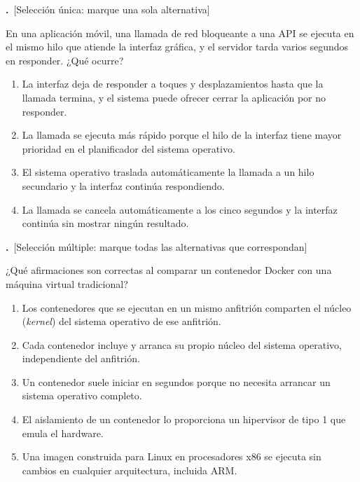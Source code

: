 \documentclass[11pt,a4paper]{article}
\newif\ifclave
\newcounter{preg}
\newcommand{\tipounica}{\textcolor{uteqMid}{\small\textsf{[Selección única: marque una sola alternativa]}}}
\newcommand{\tipomultiple}{\textcolor{uteqAmber!80!black}{\small\textsf{[Selección múltiple: marque todas las alternativas que correspondan]}}}
\newcommand{\pregunta}[2]{%
	\refstepcounter{preg}%
	\par\medskip
	\noindent\textbf{\color{uteqBlue}\arabic{preg}.}~#1\par
	\noindent #2\par\nopagebreak
}
\newcommand{\ok}{\ifclave~\textcolor{uteqGreen}{\ding{51}~\textbf{Correcta}}\fi}
\newenvironment{opciones}{%
	\begin{enumerate}[label={$\square$\ \alph*)},leftmargin=2.6em,itemsep=1pt,topsep=2pt]
}{%
	\end{enumerate}
}
\newcommand{\just}[1]{%
	\ifclave
		\begin{tcolorbox}[colback=uteqGreen!6,colframe=uteqGreen!70!black,boxrule=0.4pt,arc=1mm,left=4pt,right=4pt,top=2pt,bottom=2pt,fontupper=\small]
			\textbf{Justificación:} #1
		\end{tcolorbox}
	\fi
}
\begin{document}
\pregunta{\tipounica}{En una aplicación móvil, una llamada de red bloqueante a una API se ejecuta en el mismo hilo que atiende la interfaz gráfica, y el servidor tarda varios segundos en responder. ¿Qué ocurre?}
\begin{opciones}
	\item La interfaz deja de responder a toques y desplazamientos hasta que la llamada termina, y el sistema puede ofrecer cerrar la aplicación por no responder.\ok
	\item La llamada se ejecuta más rápido porque el hilo de la interfaz tiene mayor prioridad en el planificador del sistema operativo.
	\item El sistema operativo traslada automáticamente la llamada a un hilo secundario y la interfaz continúa respondiendo.
	\item La llamada se cancela automáticamente a los cinco segundos y la interfaz continúa sin mostrar ningún resultado.
\end{opciones}
\just{El hilo principal procesa los eventos de la interfaz; si se bloquea, la aplicación se congela (en Android se muestra el diálogo ANR, y la plataforma incluso prohíbe operaciones de red en ese hilo). Por eso las llamadas de red se ejecutan de forma asíncrona (corrutinas, \emph{futures}, \texttt{async/await}). El sistema no traslada la tarea de hilo ni la cancela por sí mismo.}

\pregunta{\tipomultiple}{¿Qué afirmaciones son correctas al comparar un contenedor Docker con una máquina virtual tradicional?}
\begin{opciones}
	\item Los contenedores que se ejecutan en un mismo anfitrión comparten el núcleo (\emph{kernel}) del sistema operativo de ese anfitrión.\ok
	\item Cada contenedor incluye y arranca su propio núcleo del sistema operativo, independiente del anfitrión.
	\item Un contenedor suele iniciar en segundos porque no necesita arrancar un sistema operativo completo.\ok
	\item El aislamiento de un contenedor lo proporciona un hipervisor de tipo 1 que emula el hardware.
	\item Una imagen construida para Linux en procesadores x86 se ejecuta sin cambios en cualquier arquitectura, incluida ARM.
\end{opciones}
\just{El contenedor es un proceso aislado mediante mecanismos del núcleo (espacios de nombres y grupos de control) y por eso arranca rápido. Las máquinas virtuales, no los contenedores, usan hipervisor y núcleo propio. Las imágenes dependen de la arquitectura del procesador; ejecutarlas en otra exige imágenes multiarquitectura o emulación.}
\end{document}
